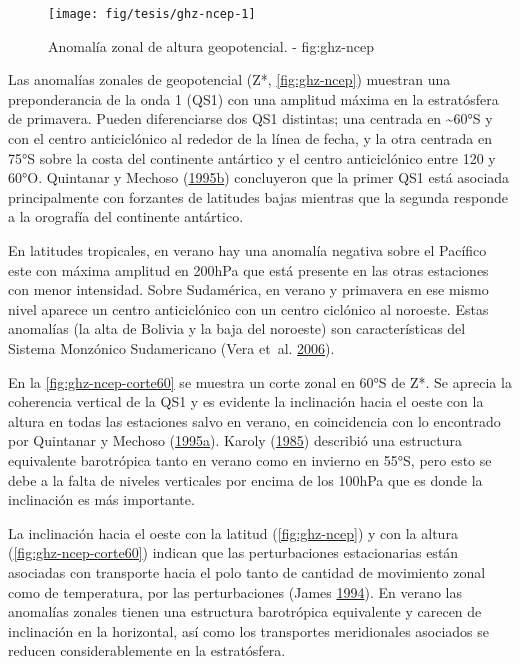 \documentclass[spanish,a4paper,12p]{book}
\begin{document}
\begin{landscape}\begin{figure}

{\centering \texttt{[image: fig/tesis/ghz-ncep-1]} 

}

\caption{Anomalía zonal de altura geopotencial. - fig:ghz-ncep}\label{fig:ghz-ncep}
\end{figure}
\end{landscape}

Las anomalías zonales de geopotencial (Z*, \autoref{fig:ghz-ncep})
muestran una preponderancia de la onda 1 (QS1) con una amplitud máxima
en la estratósfera de primavera. Pueden diferenciarse dos QS1 distintas;
una centrada en \textasciitilde{}60°S y con el centro anticiclónico al
rededor de la línea de fecha, y la otra centrada en 75°S sobre la costa
del continente antártico y el centro anticiclónico entre 120 y 60°O.
Quintanar y Mechoso
(\protect\hyperlink{ref-Quintanar1995}{1995}\protect\hyperlink{ref-Quintanar1995}{b})
concluyeron que la primer QS1 está asociada principalmente con forzantes
de latitudes bajas mientras que la segunda responde a la orografía del
continente antártico.

En latitudes tropicales, en verano hay una anomalía negativa sobre el
Pacífico este con máxima amplitud en 200hPa que está presente en las
otras estaciones con menor intensidad. Sobre Sudamérica, en verano y
primavera en ese mismo nivel aparece un centro anticiclónico con un
centro ciclónico al noroeste. Estas anomalías (la alta de Bolivia y la
baja del noroeste) son características del Sistema Monzónico
Sudamericano (Vera et~al. \protect\hyperlink{ref-Vera2006}{2006}).

En la \autoref{fig:ghz-ncep-corte60} se muestra un corte zonal en 60°S
de Z*. Se aprecia la coherencia vertical de la QS1 y es evidente la
inclinación hacia el oeste con la altura en todas las estaciones salvo
en verano, en coincidencia con lo encontrado por Quintanar y Mechoso
(\protect\hyperlink{ref-Quintanar1995a}{1995}\protect\hyperlink{ref-Quintanar1995a}{a}).
Karoly (\protect\hyperlink{ref-Karoly1985}{1985}) describió una
estructura equivalente barotrópica tanto en verano como en invierno en
55°S, pero esto se debe a la falta de niveles verticales por encima de
los 100hPa que es donde la inclinación es más importante.

La inclinación hacia el oeste con la latitud (\autoref{fig:ghz-ncep}) y
con la altura (\autoref{fig:ghz-ncep-corte60}) indican que las
perturbaciones estacionarias están asociadas con transporte hacia el
polo tanto de cantidad de movimiento zonal como de temperatura, por las
perturbaciones (James \protect\hyperlink{ref-James}{1994}). En verano
las anomalías zonales tienen una estructura barotrópica equivalente y
carecen de inclinación en la horizontal, así como los transportes
meridionales asociados se reducen considerablemente en la estratósfera.
\end{document}
